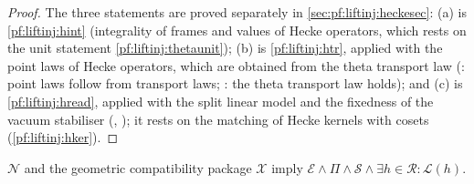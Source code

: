 \begin{proof}
The three statements are proved separately in \cref{sec:pf:liftinj:heckesec}: (a) is \cref{pf:liftinj:hint} (integrality of frames and values of Hecke
operators, which rests on the unit statement \cref{pf:liftinj:thetaunit}); (b) is \cref{pf:liftinj:htr}, applied with the point laws of Hecke
operators, which are obtained from the theta transport law
(: point laws follow from transport laws;
: the theta transport law holds); and (c) is \cref{pf:liftinj:hread}, applied with the split
linear model and the fixedness of the vacuum stabiliser (,
); it rests on the matching of Hecke kernels with cosets (\cref{pf:liftinj:hker}).
\end{proof}

\begin{theorem}\label{pf:liftinj:third}
$\mathcal N$ and the geometric compatibility package $\mathcal X$ imply $\mathcal E\wedge\Pi\wedge\mathcal S\wedge\exists h\in\mathcal R:\mathcal L(h)$.
\end{theorem}

